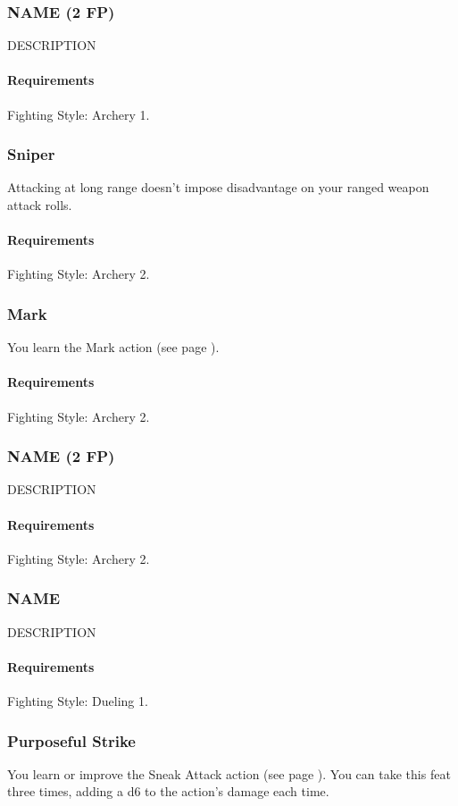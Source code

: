 \subsubsection{NAME (2 FP)} \label{feat::name}
    DESCRIPTION
    \paragraph{Requirements} Fighting Style: Archery 1.
\subsubsection{Sniper} \label{feat::sniper}
    Attacking at long range doesn't impose disadvantage on your ranged weapon attack rolls.
    \paragraph{Requirements} Fighting Style: Archery 2.
\subsubsection{Mark} \label{feat::mark}
    You learn the Mark action (see page \pageref{act::mark}).
    \paragraph{Requirements} Fighting Style: Archery 2.
\subsubsection{NAME (2 FP)} \label{feat::name}
    DESCRIPTION
    \paragraph{Requirements} Fighting Style: Archery 2.
\subsubsection{NAME} \label{feat::name}
    DESCRIPTION
    \paragraph{Requirements} Fighting Style: Dueling 1.
\subsubsection{Purposeful Strike} \label{feat::purposefulstrike}
    You learn or improve the Sneak Attack action (see page \pageref{act:sneakattack}).
    You can take this feat three times, adding a d6 to the action's damage each time.

